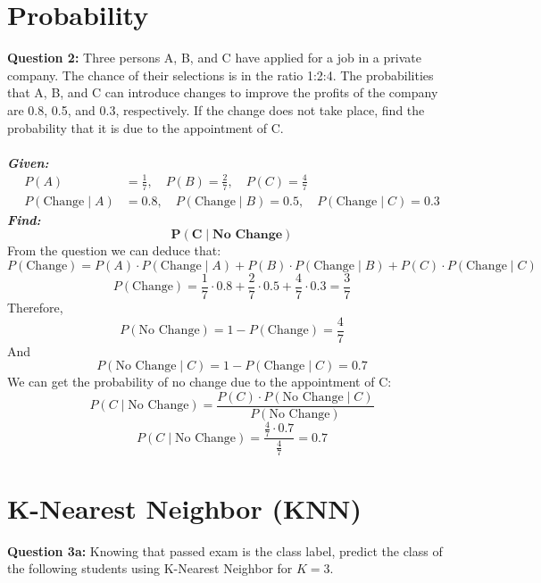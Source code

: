 \documentclass[a4paper,12pt]{article}
\begin{document}
\section{Probability}
\textbf{Question 2:}
Three persons A, B, and C have applied for a job in a private company. The chance of their selections is in the ratio 1:2:4. The probabilities that A, B, and C can introduce changes to improve the profits of the company are 0.8, 0.5, and 0.3, respectively. If the change does not take place, find the probability that it is due to the appointment of C.\\
\\\textbf{\textit{Given:}}
\begin{align*}
    P(A) &= \frac{1}{7}, \quad P(B) = \frac{2}{7}, \quad P(C) = \frac{4}{7} \\
    P(\text{Change} \mid A) &= 0.8, \quad P(\text{Change} \mid B) = 0.5, \quad P(\text{Change} \mid C) = 0.3
\end{align*}
\textbf{\textit{Find:}}
\[
\mathbf{P(C \mid \textbf{No Change})}
\]
From the question we can deduce that:
\[
P(\text{Change}) = P(A) \cdot P(\text{Change} \mid A) + P(B) \cdot P(\text{Change} \mid B) + P(C) \cdot P(\text{Change} \mid C)
\]
\[
P(\text{Change}) = \frac{1}{7} \cdot 0.8 + \frac{2}{7} \cdot 0.5 + \frac{4}{7} \cdot 0.3 = \frac{3}{7}
\]
Therefore,
\[
P(\text{No Change}) = 1 - P(\text{Change}) = \frac{4}{7}
\]
And
\[
P(\text{No Change} \mid C) = 1 - P(\text{Change} \mid C) = 0.7
\]
We can get the probability of no change due to the appointment of C:
\[
P(C \mid \text{No Change}) = \frac{P(C) \cdot P(\text{No Change} \mid C)}{P(\text{No Change})}
\]
\[
P(C \mid \text{No Change}) = \frac{\frac{4}{7} \cdot 0.7}{\frac{4}{7}} = 0.7
\]
\newpage

\section{K-Nearest Neighbor (KNN)}

\textbf{Question 3a:} Knowing that passed exam is the class label, predict the class of the following students using K-Nearest Neighbor for \( K = 3 \).\\
\end{document}
